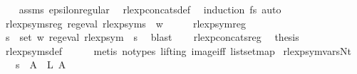 \begin{isabellebody}
%
\isadelimproof
\ \ %
\endisadelimproof
%
\isatagproof
{}\isamarkupfalse%
\ assms\ epsilon{\isacharunderscore}{\kern0pt}regular\ \isamarkupfalse%
\ rlexp{\isacharunderscore}{\kern0pt}concats{\isacharunderscore}{\kern0pt}def\ \isamarkupfalse%
\ {\isacharparenleft}{\kern0pt}induction\ fs{\isacharparenright}{\kern0pt}\ auto%
\endisatagproof
{\isafoldproof}%
%
\isadelimproof
\isanewline
%
\endisadelimproof
\isanewline
{}\isamarkupfalse%
\ rlexp{\isacharunderscore}{\kern0pt}syms{\isacharunderscore}{\kern0pt}reg{\isacharcolon}{\kern0pt}\ {\isachardoublequoteopen}reg{\isacharunderscore}{\kern0pt}eval\ {\isacharparenleft}{\kern0pt}rlexp{\isacharunderscore}{\kern0pt}syms\ {\isasymgamma}{\isacharprime}{\kern0pt}\ w{\isacharparenright}{\kern0pt}{\isachardoublequoteclose}\isanewline
%
\isadelimproof
%
\endisadelimproof
%
\isatagproof
{}\isamarkupfalse%
\ {\isacharminus}{\kern0pt}\isanewline
\ \ \isamarkupfalse%
\ rlexp{\isacharunderscore}{\kern0pt}sym{\isacharunderscore}{\kern0pt}reg\ \isamarkupfalse%
\ {\isachardoublequoteopen}{\isasymforall}s\ {\isasymin}\ set\ w{\isachardot}{\kern0pt}\ reg{\isacharunderscore}{\kern0pt}eval\ {\isacharparenleft}{\kern0pt}rlexp{\isacharunderscore}{\kern0pt}sym\ {\isasymgamma}{\isacharprime}{\kern0pt}\ s{\isacharparenright}{\kern0pt}{\isachardoublequoteclose}\ \isamarkupfalse%
\ blast\isanewline
\ \ \isamarkupfalse%
\ rlexp{\isacharunderscore}{\kern0pt}concats{\isacharunderscore}{\kern0pt}reg\ \isamarkupfalse%
\ {\isacharquery}{\kern0pt}thesis\ \isamarkupfalse%
\ rlexp{\isacharunderscore}{\kern0pt}syms{\isacharunderscore}{\kern0pt}def\isanewline
\ \ \ \ \isamarkupfalse%
\ {\isacharparenleft}{\kern0pt}metis\ {\isacharparenleft}{\kern0pt}no{\isacharunderscore}{\kern0pt}types{\isacharcomma}{\kern0pt}\ lifting{\isacharparenright}{\kern0pt}\ image{\isacharunderscore}{\kern0pt}iff\ list{\isachardot}{\kern0pt}set{\isacharunderscore}{\kern0pt}map{\isacharparenright}{\kern0pt}\isanewline
{}\isamarkupfalse%
%
\endisatagproof
{\isafoldproof}%
%
\isadelimproof
\isanewline
%
\endisadelimproof
\isanewline
\isanewline
{}\isamarkupfalse%
\ rlexp{\isacharunderscore}{\kern0pt}sym{\isacharunderscore}{\kern0pt}vars{\isacharunderscore}{\kern0pt}Nt{\isacharcolon}{\kern0pt}\isanewline
\ \ \ {\isachardoublequoteopen}s\ {\isacharparenleft}{\kern0pt}{\isasymgamma}{\isacharprime}{\kern0pt}\ A{\isacharparenright}{\kern0pt}\ {\isacharequal}{\kern0pt}\ L\ A{\isachardoublequoteclose}\isanewline

\end{isabellebody}
